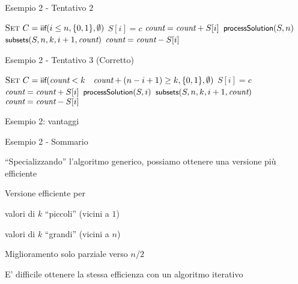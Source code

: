 \begin{frame}{Esempio 2 - Tentativo 2}
	
\begin{Procedure}
\caption[A]{\enumerasottoinsiemi($\INTEGER[\,]\ S$, \INTEGER $n$, \INTEGER $k$, \INTEGER $i$, \INTEGER \Count)}
$\textsc{Set}\ C = \textsf{{\small iif}}(i \leq n, \{ 0, 1 \}, \emptyset)$\;
{
  $S[i] = c$\;
  $\textit{count} = \textit{count} + S[i]$\;
  {
    $\textsf{{\small processSolution}}(S,n)$\;
  }
  $\textsf{{\small subsets}}(S, n, k, i+1, \textit{count})$\;
  $\textit{count} = \textit{count} - S[i]$\;
}
\end{Procedure}


\end{frame}

\begin{frame}{Esempio 2 - Tentativo 3 (Corretto)}

\begin{Procedure}
\caption[A]{\enumerasottoinsiemi($\INTEGER[\,]\ S$, \INTEGER $n$, \INTEGER $k$, \INTEGER $i$, \INTEGER \Count)}
$\textsc{Set}\ C = \textsf{{\small iif}}(\textit{count} < k$ \AND\ $\textit{count} + (n-i+1) \geq k, \{ 0, 1 \}, \emptyset)$\;
{
  $S[i] = c$\;
  $\textit{count} = \textit{count} + S[i]$\;
  {
    $\textsf{{\small processSolution}}(S,i)$\;
  }{
    $\textsf{{\small subsets}}(S, n, k, i+1, \textit{count})$\;
  }
  $\textit{count} = \textit{count} - S[i]$\;
}
\end{Procedure}

\end{frame}

\begin{frame}{Esempio 2: vantaggi}


\end{frame}

\begin{frame}{Esempio 2 - Sommario}

\BIL
\item  “Specializzando” l'algoritmo generico, possiamo ottenere una versione più efficiente
\item  Versione efficiente per 
\BI
	\item valori di $k$ “piccoli” (vicini a $1$)
	\item valori di $k$ “grandi” (vicini a $n$)
\EI
\item Miglioramento solo parziale verso $n/2$
\item E' difficile ottenere la stessa efficienza con un algoritmo iterativo
\EIL
	
\end{frame}

